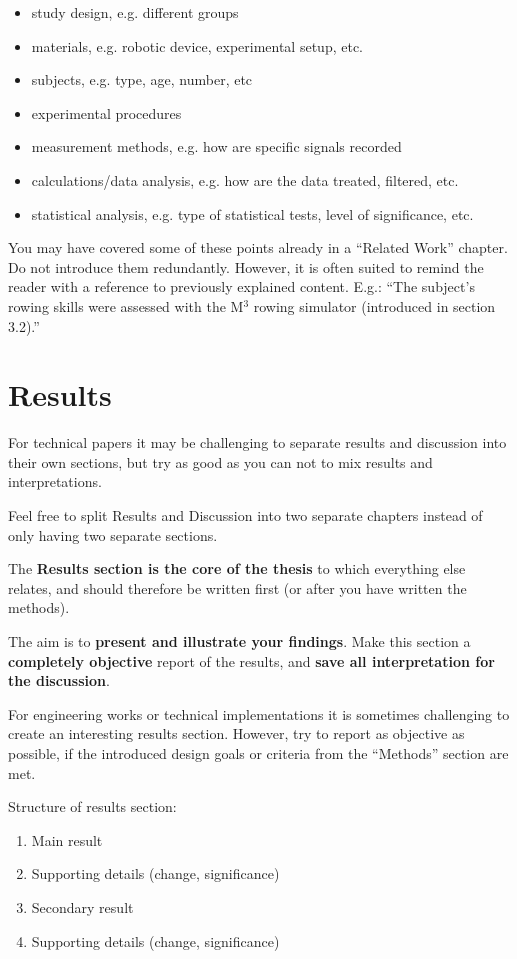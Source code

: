 \begin{itemize}
	\item study design, e.g. different groups
	\item materials, e.g. robotic device, experimental setup, etc.
	\item subjects, e.g. type, age, number, etc
	\item experimental procedures
	\item measurement methods, e.g. how are specific signals recorded
	\item calculations/data analysis, e.g. how are the data treated, filtered, etc.
	\item statistical analysis, e.g. type of statistical tests, level of significance, etc.
\end{itemize}

You may have covered some of these points already in a ``Related Work'' chapter.
Do not introduce them redundantly.
However, it is often suited to remind the reader with a reference to previously explained content.
E.g.: ``The subject's rowing skills were assessed with the M$^3$ rowing simulator (introduced in section 3.2).''

\section{Results}\label{AboutResults}

For technical papers it may be challenging to separate results and discussion into their own sections, but try as good as you can not to mix results and interpretations.

Feel free to split Results and Discussion into two separate chapters instead of only having two separate sections.

The \textbf{Results section is the core of the thesis} to which everything else relates, and should therefore be written first (or after you have written the methods). 	

The aim is to \textbf{present and illustrate your findings}. Make this section a \textbf{completely objective} report of the results, and \textbf{save all interpretation for the discussion}.

For engineering works or technical implementations it is sometimes challenging to create an interesting results section.
However, try to report as objective as possible, if the introduced design goals or criteria from the ``Methods'' section are met.

Structure of results section:
\begin{enumerate}
	\item Main result
	\item Supporting details (change, significance)
	\item Secondary result
	\item Supporting details (change, significance)
\end{enumerate}

